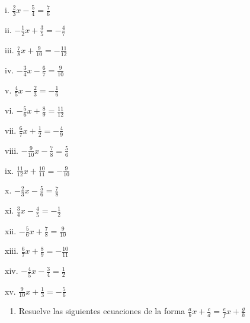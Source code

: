 \documentclass[]{book}
\providecommand{\tightlist}{%
  \setlength{\itemsep}{0pt}\setlength{\parskip}{0pt}}
\begin{document}
\begin{multicols}{2}
    i. $\frac{2}{3}x - \frac{5}{4} = \frac{7}{6}$

    ii. $-\frac{1}{2}x + \frac{3}{5} = -\frac{4}{7}$

    iii. $\frac{7}{8}x + \frac{9}{10} = -\frac{11}{12}$

    iv. $-\frac{3}{4}x - \frac{6}{7} = \frac{9}{10}$

    v. $\frac{4}{5}x - \frac{2}{3} = -\frac{1}{6}$

    vi. $-\frac{5}{6}x + \frac{8}{9} = \frac{11}{12}$

    vii. $\frac{6}{7}x + \frac{1}{2} = -\frac{4}{9}$

    viii. $-\frac{9}{10}x - \frac{7}{8} = \frac{5}{6}$

    ix. $\frac{11}{12}x + \frac{10}{11} = -\frac{9}{10}$

    x. $-\frac{2}{3}x - \frac{5}{6} = \frac{7}{8}$

    xi. $\frac{3}{4}x - \frac{4}{5} = -\frac{1}{2}$

    xii. $-\frac{5}{6}x + \frac{7}{8} = \frac{9}{10}$
  
    xiii. $\frac{6}{7}x + \frac{8}{9} = -\frac{10}{11}$

    xiv. $-\frac{4}{5}x - \frac{3}{4} = \frac{1}{2}$

    xv. $\frac{9}{10}x + \frac{1}{3} = -\frac{5}{6}$
\end{multicols}

\begin{enumerate}
\def\labelenumi{\arabic{enumi}.}
\setcounter{enumi}{2}
\tightlist
\item
  Resuelve las siguientes ecuaciones de la forma
  \(\frac{a}{b}x+\frac{c}{d}=\frac{e}{f}x+\frac{g}{h}\)
\end{enumerate}
\end{document}
